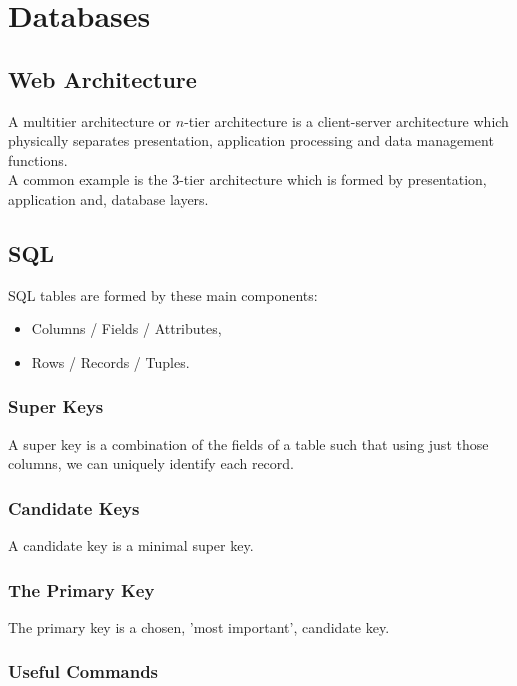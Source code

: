 \section{Databases}

\subsection{Web Architecture}

A multitier architecture or $n$-tier architecture is a 
client-server
architecture which physically separates presentation,
application processing and data management functions.
\\[\baselineskip]
A common example is the 3-tier architecture which is formed
by presentation, application and, database layers.

\subsection{SQL}

SQL tables are formed by these main components: \begin{itemize}
    \item Columns / Fields / Attributes,
    \item Rows / Records / Tuples.
\end{itemize}

\subsubsection{Super Keys}

A super key is a combination of the fields of a table such that
using just those columns, we can uniquely identify each record.

\subsubsection{Candidate Keys}

A candidate key is a minimal super key.

\subsubsection{The Primary Key}

The primary key is a chosen, 'most important', candidate key.

\newpage

\subsubsection{Useful Commands}

